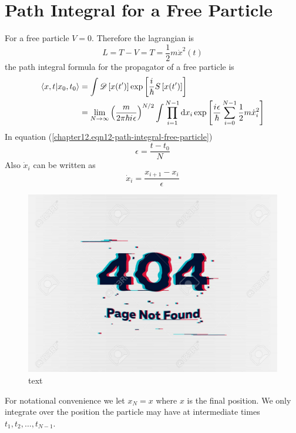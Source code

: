 	\section{Path Integral for a Free Particle}
	For a free particle $V=0$. Therefore the lagrangian is
	\begin{equation}
		L = T - V = T = \frac{1}{2} m \dot{x}^2(t)
		\label{chapter12.eqn11-path-integral-free-particle}
	\end{equation}
	the path integral formula for the propagator of a free particle is
	\begin{align}
		\braket{x, t}{x_0, t_0} 
		&= \int \mathcal{D}\left[x(t^\prime)\right] \exp\left[\frac{{i\mkern1mu}}{\hbar} S\left[x(t^\prime)\right]\right] \\
		&= \lim\limits_{N \rightarrow \infty} \left(\frac{m}{2 \pi \hbar {i\mkern1mu} \epsilon}\right)^{N/2} \int \prod_{i=1}^{N-1} \dd{x_i} \exp\left[\frac{{i\mkern1mu} \epsilon}{\hbar} \sum_{i=0}^{N-1} \frac{1}{2} m \dot{x}_i^2\right]
		\label{chapter12.eqn12-path-integral-free-particle}
	\end{align}
	In equation (\ref{chapter12.eqn12-path-integral-free-particle})
	\begin{equation}
		\epsilon = \frac{t - t_0}{N}
	\end{equation}
	Also $\dot{x}_i$ can be written as
	\begin{equation}
		\dot{x}_i = \frac{x_{i+1} - x_i}{\epsilon}
		\label{chapter12.eqn13-path-integral-free-particle}
	\end{equation}
	
	\begin{figure}
		\centering
		\includegraphics[width=0.5\linewidth]{Pictures/not-found.jpg}
		\caption{text}
		\label{chapter12.fig2}
	\end{figure}
	For notational convenience we let $x_N = x$ where $x$ is the final position. We only integrate over the position the particle may have at intermediate times $t_1, t_2, \ldots, t_{N-1}$.
	
